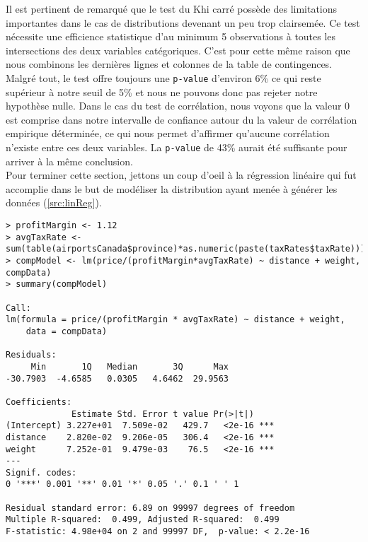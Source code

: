 \vspace{\baselineskip}
Il est pertinent de remarqué que le test du Khi carré possède des limitations importantes dans le cas de distributions devenant un peu trop clairsemée. Ce test nécessite une efficience statistique d'au minimum 5 observations à toutes les intersections des deux variables catégoriques. C'est pour cette même raison que nous combinons les dernières lignes et colonnes de la table de contingences. Malgré tout, le test offre toujours une \texttt{p-value} d'environ 6\% ce qui reste supérieur à notre seuil de 5\% et nous ne pouvons donc pas rejeter notre hypothèse nulle. Dans le cas du test de corrélation, nous voyons que la valeur 0 est comprise dans notre intervalle de confiance autour du la valeur de corrélation empirique déterminée, ce qui nous permet d'affirmer qu'aucune corrélation n'existe entre ces deux variables. La \texttt{p-value} de 43\% aurait été suffisante pour arriver à la même conclusion. \\

Pour terminer cette section, jettons un coup d'oeil à la régression linéaire qui fut accomplie dans le but de modéliser la distribution ayant menée à générer les données (\autoref{src:linReg}).

\begin{lstlisting}[caption = Régression linéaire sur données empiriques,label=src:linReg]
> profitMargin <- 1.12
> avgTaxRate <- sum(table(airportsCanada$province)*as.numeric(paste(taxRates$taxRate)))/length(airportsCanada$province)
> compModel <- lm(price/(profitMargin*avgTaxRate) ~ distance + weight, compData)
> summary(compModel)

Call:
lm(formula = price/(profitMargin * avgTaxRate) ~ distance + weight, 
    data = compData)

Residuals:
     Min       1Q   Median       3Q      Max 
-30.7903  -4.6585   0.0305   4.6462  29.9563 

Coefficients:
             Estimate Std. Error t value Pr(>|t|)    
(Intercept) 3.227e+01  7.509e-02   429.7   <2e-16 ***
distance    2.820e-02  9.206e-05   306.4   <2e-16 ***
weight      7.252e-01  9.479e-03    76.5   <2e-16 ***
---
Signif. codes:  
0 '***' 0.001 '**' 0.01 '*' 0.05 '.' 0.1 ' ' 1

Residual standard error: 6.89 on 99997 degrees of freedom
Multiple R-squared:  0.499,	Adjusted R-squared:  0.499 
F-statistic: 4.98e+04 on 2 and 99997 DF,  p-value: < 2.2e-16
\end{lstlisting}

